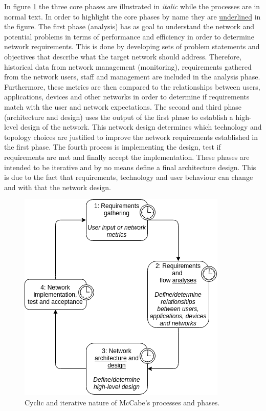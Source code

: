 In figure \ref{fig:mccabe-process} the three core phases are illustrated in \textit{italic} while the processes are in normal text. In order to highlight the core phases by name they are \underline{underlined} in the figure. The first phase (analysis) has as goal to understand the network and potential problems in terms of performance and efficiency in order to determine network requirements. This is done by developing sets of problem statements and objectives that describe what the target network should address. Therefore, historical data from network management (monitoring), requirements gathered from the network users, staff and management are included in the analysis phase. Furthermore, these metrics are then compared to the relationships between users, applications, devices and other networks in order to determine if requirements match with the user and network expectations. The second and third phase (architecture and design) uses the output of the first phase to establish a high-level design of the network. This network design determines which technology and topology choices are justified to improve the network requirements established in the first phase. The fourth process is implementing the design, test if requirements are met and finally accept the implementation. These phases are intended to be iterative and by no means define a final architecture design. This is due to the fact that requirements, technology and user behaviour can change and with that the network design.

\begin{figure}[H]
\centering
\includegraphics[width=\columnwidth/2]{Images/mccabe-process.png}
\caption{Cyclic and iterative nature of McCabe's processes and phases.}
\label{fig:mccabe-process}
\end{figure}

